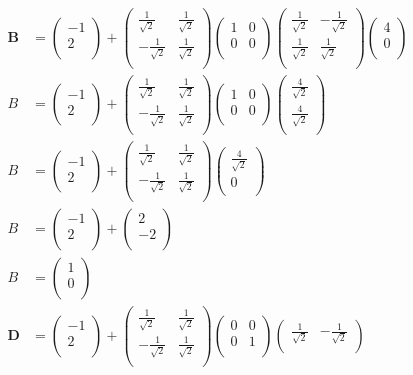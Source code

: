 \documentclass[12pt]{article}
\newcommand{\myvec}[1]{\ensuremath{\begin{pmatrix}#1\end{pmatrix}}}
\let\vec\mathbf
\begin{document}
\begin{align}
\vec{B} &= \myvec{
-1\\
2\\
}+\myvec{
\frac{1}{\sqrt{2}} & \frac{1}{\sqrt{2}} \\
-\frac{1}{\sqrt{2}} & \frac{1}{\sqrt{2}}\\
}\myvec{
 1&0\\
 0&0\\
}\myvec{
\frac{1}{\sqrt{2}} & -\frac{1}{\sqrt{2}} \\
\frac{1}{\sqrt{2}} & \frac{1}{\sqrt{2}}\\
}\myvec{
4\\
0\\
}\\
B &= \myvec{
-1\\
2\\
}+\myvec{
\frac{1}{\sqrt{2}} & \frac{1}{\sqrt{2}} \\
-\frac{1}{\sqrt{2}} & \frac{1}{\sqrt{2}}\\
}\myvec{
 1&0\\
 0&0\\
}\myvec{
\frac{4}{\sqrt{2}}\\
\frac{4}{\sqrt{2}}\\
}\\
B &= \myvec{
-1\\
2\\
}+\myvec{
\frac{1}{\sqrt{2}} & \frac{1}{\sqrt{2}} \\
-\frac{1}{\sqrt{2}} & \frac{1}{\sqrt{2}}\\
}\myvec{
\frac{4}{\sqrt{2}}\\
0\\
}\\
B &= \myvec{
-1\\
2\\
}+\myvec{
2\\
-2\\
}\\
B &= \myvec{
1\\
0\\
}\\
\vec{D} &= \myvec{
-1\\
2\\
}+\myvec{
\frac{1}{\sqrt{2}} & \frac{1}{\sqrt{2}} \\
-\frac{1}{\sqrt{2}} & \frac{1}{\sqrt{2}}\\
}\myvec{
 0&0\\
 0&1\\
}\myvec{
\frac{1}{\sqrt{2}} & -\frac{1}{\sqrt{2}} \\
}
\end{align}
\end{document}

